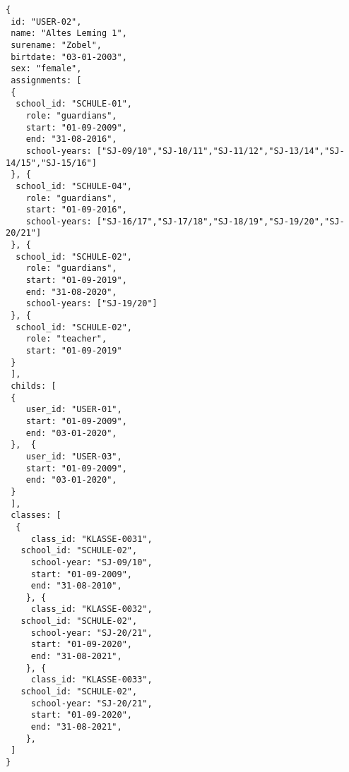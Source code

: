 
\begin{lstlisting}[caption={Beispiel 1 Lehrer + Eltern},frame=tlrb]
{
 id: "USER-02",
 name: "Altes Leming 1",
 surename: "Zobel",
 birtdate: "03-01-2003",
 sex: "female",
 assignments: [
 {
  school_id: "SCHULE-01",
	role: "guardians",
	start: "01-09-2009",
	end: "31-08-2016",
	school-years: ["SJ-09/10","SJ-10/11","SJ-11/12","SJ-13/14","SJ-14/15","SJ-15/16"]
 }, {
  school_id: "SCHULE-04",
	role: "guardians",
	start: "01-09-2016",
	school-years: ["SJ-16/17","SJ-17/18","SJ-18/19","SJ-19/20","SJ-20/21"]
 }, {
  school_id: "SCHULE-02",
	role: "guardians",
	start: "01-09-2019",
	end: "31-08-2020",
	school-years: ["SJ-19/20"]
 }, {
  school_id: "SCHULE-02",
	role: "teacher",
	start: "01-09-2019"
 }
 ],
 childs: [
 {
	user_id: "USER-01",
	start: "01-09-2009",
	end: "03-01-2020",
 },  {
	user_id: "USER-03",
	start: "01-09-2009",
	end: "03-01-2020",
 }
 ],
 classes: [
  {
	 class_id: "KLASSE-0031",
   school_id: "SCHULE-02",
	 school-year: "SJ-09/10",
	 start: "01-09-2009",
	 end: "31-08-2010",
	}, {
	 class_id: "KLASSE-0032",
   school_id: "SCHULE-02",
	 school-year: "SJ-20/21",
	 start: "01-09-2020",
	 end: "31-08-2021",
	}, {
	 class_id: "KLASSE-0033",
   school_id: "SCHULE-02",
	 school-year: "SJ-20/21",
	 start: "01-09-2020",
	 end: "31-08-2021",
	}, 
 ]
}
\end{lstlisting}
